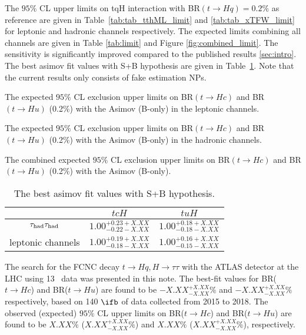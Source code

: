 The $95\%$ CL upper limits on tqH interaction with BR$(t\to Hq)=0.2\%$ as reference are given in Table~\ref{tab:tab_tthML_limit} and \ref{tab:tab_xTFW_limit} for leptonic and hadronic channels respectively. The expected limits combining all channels are given in Table \ref{tab:limit} and Figure \ref{fig:combined_limit}. The sensitivity is significantly improved compared to the published results \ref{sec:intro}. The best asimov fit values with S+B hypothesis are given in Table~\ref{tab:tab_best_fit}. Note that the current results only consists of fake estimation NPs.

\begin{table}[htb]
\caption{ The expected $95\%$ CL exclusion upper limits on BR$(t\to Hc)$ and BR$(t\to Hu)$ (0.2\%) with the Asimov (B-only) in the leptonic channels.}

\label{tab:tab_tthML_limit}
\end{table}

\begin{table}[htb]
\caption{ The expected $95\%$ CL exclusion upper limits on BR$(t\to Hc)$ and BR$(t\to Hu)$ (0.2\%) with the Asimov (B-only) in the hadronic channels.}

\label{tab:tab_xTFW_limit}
\end{table}

\begin{table}[htb]
\caption{ The combined expected $95\%$ CL exclusion upper limits on BR$(t\to Hc)$ and BR$(t\to Hu)$ (0.2\%) with the Asimov (B-only).}

\label{tab:limit}
\end{table}

\begin{table}[htb]
\caption{ The best asimov fit values with S+B hypothesis. }
\centering
\begin{tabular}{|c|c|c|} \hline
  & $tcH$ & $tuH$ \\ \hline
  $\tau_\text{had}{}\tau_\text{had}$ & $1.00^{+0.23 +X.XX}_{-0.22 -X.XX}$ & $1.00^{+0.18 +X.XX}_{-0.18 -X.XX}$ \\ \hline
  leptonic channels & $1.00^{+0.19 +X.XX}_{-0.18 -X.XX}$ & $1.00^{+0.16 +X.XX}_{-0.15 -X.XX}$ \\ \hline
\end{tabular}
\label{tab:tab_best_fit}
\end{table}


The search for the FCNC decay $t\to Hq, H\to\tau\tau$ with the ATLAS detector at the LHC using 13~\TeV{} data was presented in this note. The best-fit values for BR($t\to Hc$) and BR($t\to Hu$) are found to be $-X.XX^{+X.XX}_{-X.XX}\%$ and $-X.XX^{+X.XX}_{-X.XX}\%$ respectively, based on 140 $\ifb$ of data collected from 2015 to 2018. The observed (expected) $95\%$ CL upper limits on BR($t\to Hc$) and BR($t\to Hu$) are found to be $X.XX\%$ ($X.XX^{+X.XX}_{-X.XX}\%$) and $X.XX\%$ ($X.XX^{+X.XX}_{-X.XX}\%$), respectively.
